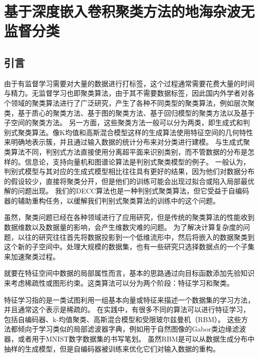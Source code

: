 \chapter{基于深度嵌入卷积聚类方法的地海杂波无监督分类}
\section{引言}
由于有监督学习需要对大量的数据进行打标签，这个过程通常需要花费大量的时间与精力。无监督学习也即聚类算法，由于其不需要数据标签，因此国内外学者对各个领域的聚类算法进行了广泛研究，产生了各种不同类型的聚类算法，例如层次聚类\cite{heller2005bayesian}，基于质心的聚类方法\cite{lloyd1982least}、基于图的聚类方法\cite{shi2000normalized}、基于回归模型\cite{wang2013multi}的聚类方法以及基于子空间\cite{agrawal1998automatic}的聚类方法。
另一方面，这些聚类方法一般可以分为两类，即生成式和判别式聚类算法。像K均值和高斯混合模型\cite{biernacki2000assessing}这样的生成算法使用特征空间的几何特性来明确地表示簇，并且通过输入数据的统计分布来对分类进行建模。
与生成式聚类算法不同，判别式方法直接使用分离超平面来识别类别，而不管数据的分布是怎样的。信息论\cite{li2004minimum}，支持向量机\cite{xu2005maximum}和图谱论\cite{ng2002spectral}算法是判别式聚类模型的例子。
一般认为，判别式模型与其对应的生成式模型相比往往具有更好的结果，因为他们对数据分布的假设较少，直接将聚类分开，但是他们的训练可能会出现过拟合或陷入局部最优解的问题出现\cite{raina2004classification}。
我们的DECC算法也是一种判别式聚类算法，但它受益于自编码器的辅助重构任务，以缓解我们判别式聚类算法的训练中的这个问题。

虽然，聚类问题已经在各种领域进行了应用研究，但是传统的聚类算法的性能收到数据维数以及数据量的影响，会产生维数灾难的问题。
为了解决计算复杂度的问题，以往的研究往往首先将数据投影到一个低维流形中，然后将嵌入的数据聚类到这个新的子空间中\cite{roth2004feature}。处理大规模的数据集，也有一些研究只选择数据点的一个子集来加速聚类过程\cite{shinnou2008spectral}。

就要在特征空间中数据的局部属性而言，基本的思路通过向目标函数添加先验知识来考虑稀疏性或图形约束\cite{tian2014learning}。这类算法可以分为两个阶段：特征学习和聚类。

特征学习指的是一类试图利用一组基本向量或特征来描述一个数据集的学习方法，并且通常这个表示是稀疏的。
在实践中，有很多不同的算法可以进行特征学习，包括自编码器、k-均值聚类、高斯混合模型和受限玻尔兹曼机（RBM）\cite{coates2011analysis}。
这些方法都倾向于学习类似的局部滤波器字典\cite{coates2011analysis}，例如用于自然图像的Gabor类边缘滤波器，或者用于MNIST数字数据集的书写笔划。
虽然RBM是可以从数据生成分布中抽样的生成模型\cite{hinton2010practical}，但是自编码器被训练来优化它们对输入数据的重构。

